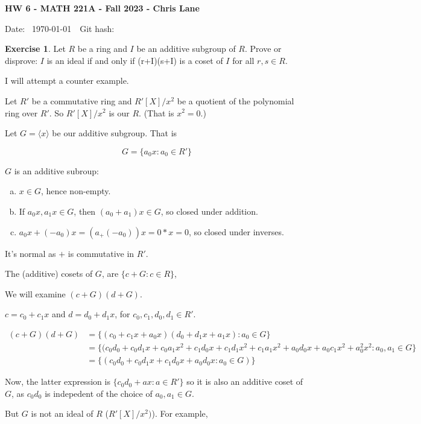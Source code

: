 \documentclass[11pt,oneside]{article}
\numberwithin{equation}{section}
\theoremstyle{definition}
\newtheorem{exercise}{Exercise}
\begin{document}
\textbf{HW 6 - MATH 221A - Fall 2023 - Chris Lane}

Date: \hhmmsstime{} \ \today \ \ Git hash: 


\begin{exercise}
  Let $R$ be a ring and $I$ be an additive subgroup of $R$.  Prove or
  disprove: $I$ is an ideal if and only if (r+I)(s+I) is a coset of
  $I$ for all $r, s \in R$.
\end{exercise}
\begin{solution}
  I will attempt a counter example.

  Let $R'$ be a commutative ring and $R'[X]/x^2$ be a quotient of the
  polynomial ring over $R'$. So $R'[X]/x^2$ is our $R$.  (That is $x^2 = 0$.)

  Let $G = \langle x \rangle$ be our additive subgroup.  That is

  $$
  G = \{ a_0 x : a_0 \in R' \}
  $$

  $G$ is an additive subroup:

  \begin{enumerate}[(a)]
  \item
    $x \in G$, hence non-empty.
  \item
    If $a_0 x, a_1x \in G$, then $(a_0 + a_1)x \in G$, so closed
    under addition.
  \item
    $a_0 x + (-a_0)x = (a_ + (-a_0)) x = 0 * x = 0$, so closed
    under inverses.
  \end{enumerate}

  It's normal as $+$ is commutative in $R'$. 
  
  The (additive) cosets of $G$, are $ \{ c + G : c \in R \} $,

  We will examine $(c + G) ( d + G)$.

  $c = c_0 + c_1 x$ and $d = d_0 + d_1 x$, for $c_0, c_1, d_0, d_1 \in R'$.

  \begin{align*}
    (c + G) (d + G) &= \{ (c_0 + c_1 x + a_0 x) ( d_0 + d_1 x + a_1 x): a_0 \in G \} \\
    &= \{ (c_0 d_0 + c_0 d_1 x + c_0 a_1 x^2 + c_1 d_0 x + c_1 d_1 x^ 2 + c_1 a_1 x^2 + a_0 d_0 x + a_0 c_1 x^2 + a_0 ^2 x^2 : a_0, a_1 \in G \} \\
    &= \{ (c_0 d_0 + c_0 d_1 x + c_1 d_0 x + a_0 d_0 x : a_0 \in G) \}  
  \end{align*}

  Now, the latter expression is $ \{ c_0 d_0 + a x : a \in R' \} $ so it is also
  an additive coset of $G$, as $c_0 d_0 $ is indepedent of the choice of $a_0, a_1 \in G$.

  But $G$ is not an ideal of $R$ ($R'[X]/x^2)$).  For example, 
    
\end{solution}
\end{document}
